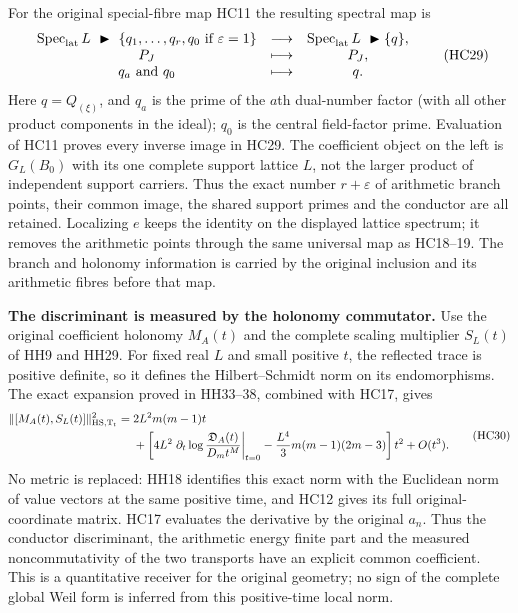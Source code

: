 For the original special-fibre map HC11 the resulting spectral map is
\[
 \begin{array}{ccc}
 \operatorname{Spec}_{\rm lat}L\ \blacktriangleright\
       \{q_1,\ldots,q_r,q_0\text{ if }\varepsilon=1\}
 &\longrightarrow&
 \operatorname{Spec}_{\rm lat}L\ \blacktriangleright\{q\},\\
 P_J&\longmapsto&P_J,\\
 q_a\ \text{and }q_0&\longmapsto&q.
 \end{array}
 \tag{HC29}
\]
Here $q=Q_{(\xi)}$, and $q_a$ is the prime of the $a$th dual-number
factor (with all other product components in the ideal); $q_0$
is the central field-factor prime. Evaluation of HC11 proves every
inverse image in HC29. The coefficient object on the left is
$G_L(B_0)$ with its one complete support lattice $L$, not the
larger product of independent support carriers. Thus the exact
number $r+\varepsilon$ of arithmetic branch points, their common
image, the shared support primes and the conductor are all retained.
Localizing $e$ keeps the identity on the displayed lattice spectrum;
it removes the arithmetic points through the same universal map
as HC18--19. The branch and holonomy information is carried by
the original inclusion and its arithmetic fibres before that map.

\HC\textbf{The discriminant is measured by the holonomy commutator.}
Use the original coefficient holonomy $M_A(t)$ and the complete
scaling multiplier $S_L(t)$ of HH9 and HH29. For fixed real $L$
and small positive $t$, the reflected trace is positive definite,
so it defines the Hilbert--Schmidt norm on its endomorphisms.
The exact expansion proved in HH33--38, combined with HC17, gives
\[
 \begin{split}
 \|[M_A(t),S_L(t)]\|_{\rm HS,T_t}^2
  ={}&2L^2m(m-1)t\\
   &+\left[
       4L^2\left.\partial_t\log
           \frac{\mathfrak D_A(t)}{D_m t^M}\right|_{t=0}
       -\frac{L^4}3m(m-1)(2m-3)
     \right]t^2+O(t^3).
 \end{split}
 \tag{HC30}
\]
No metric is replaced: HH18 identifies this exact norm with the
Euclidean norm of value vectors at the same positive time, and
HC12 gives its full original-coordinate matrix. HC17 evaluates
the derivative by the original $a_n$. Thus the conductor
discriminant, the arithmetic energy finite part and the measured
noncommutativity of the two transports have an explicit common
coefficient. This is a quantitative receiver for the original
geometry; no sign of the complete global Weil form is inferred
from this positive-time local norm.

